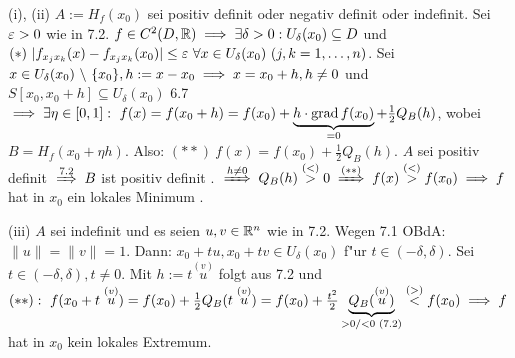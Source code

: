 \documentclass[a4paper,twoside,DIV15,BCOR12mm]{scrbook}
\begin{document}
\begin{beweis}
\begin{liste}
\item[(i),]
(ii) $A:=H_f(x_0)$ sei positiv definit oder negativ definit oder indefinit. Sei $\varepsilon>0$ wie in 7.2. $f\in C^2(D,\mathbb{R})\implies \exists \delta>0: U_\delta(x_0)\subseteq D$ und $(*)\ |f_{x_jx_k}(x)-f_{x_jx_k}(x_0)|\le\ep\ \forall x\in U_\delta(x_0)\ (j,k=1,\ldots,n)$. Sei $x\in U_\delta(x_0) \ \backslash\ \{x_0\}, h:=x-x_0\implies x=x_0+h, h\ne 0$ und $S[x_0,x_0+h] \subseteq U_\delta(x_0)$ 6.7$\folgt\exists \eta\in [0,1]:\ f(x)=f(x_0+h)=f(x_0) + \underbrace{h\cdot \grad f(x_0)}_{=0}+\frac{1}{2}Q_B(h)$, wobei $B=H_f(x_0 + \eta h)$. Also: $(**)\ f(x)=f(x_0)+\frac{1}{2}Q_B(h)$. $A$ sei positiv definit  $\folgtnach{7.2} B$ ist positiv definit . $\folgtwegen{h\ne 0}Q_B(h)\stackrel{(<)}{>}0 \folgtwegen{(**)}f(x)\stackrel{(<)}{>}f(x_0)\folgt f$ hat in $x_0$ ein lokales Minimum .
\item[(iii)]$A$ sei indefinit und es seien $u, v\in\mathbb{R}^n$ wie in 7.2. Wegen 7.1 OBdA: $\|u\|=\|v\|=1$. Dann: $x_0+tu, x_0+tv \in U_\delta(x_0)$ f"ur $t\in(-\delta, \delta)$. Sei $t\in(-\delta, \delta), t\ne 0$. Mit $h:=t\stackrel{(v)}{u}$ folgt aus 7.2 und $(**):\ f(x_0+t\stackrel{(v)}{u})=f(x_0)+\frac{1}{2}Q_B(t\stackrel{(v)}{u})=f(x_0)+\frac{t^2}{2}\underbrace{Q_B(\stackrel{(v)}{u})}_{>0\text{/}<0\text{ (7.2)}}\stackrel{(>)}{<}f(x_0)\folgt f$ hat in $x_0$ kein lokales Extremum.
\end{liste}
\end{beweis}
\end{document}
